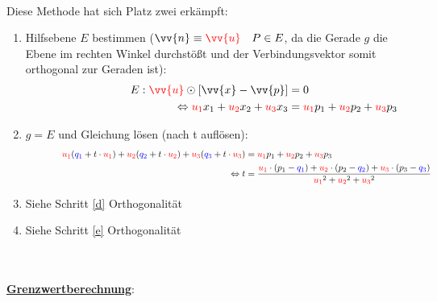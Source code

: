 \documentclass[main.tex]{subfiles}
\begin{document}
            \paragraph{} Diese Methode hat sich Platz zwei erkämpft:
                \begin{enumerate}[1)]
                    \item Hilfsebene $E$ bestimmen ($\vv{n}\equiv\textcolor{red}{\vv{u}}\quad P\in E$, da die Gerade $g$ die Ebene im rechten Winkel durchstößt und
                    der Verbindungsvektor somit orthogonal zur Geraden ist):
                    \begin{align*}
                        \qquad \qquad \qquad \qquad E:\textcolor{red}{\vv{u}} \odot [\vv{x} - \vv{p}] &= 0 \\
                                                    \Leftrightarrow \textcolor{red}{u_1}x_1 + \textcolor{red}{u_2}x_2 + \textcolor{red}{u_3}x_3 &= \textcolor{red}{u_1}p_1 + \textcolor{red}{u_2}p_2 + \textcolor{red}{u_3}p_3
                    \end{align*}
                    \item $g = E$ und Gleichung lösen (nach t auflösen):
                    \begin{align*}
                        \qquad \qquad \textcolor{red}{u_1}(\textcolor{blue}{q_1} + t \cdot \textcolor{red}{u_1}) + \textcolor{red}{u_2}(\textcolor{blue}{q_2}+t\cdot \textcolor{red}{u_2}) + \textcolor{red}{u_3}(\textcolor{blue}{q_3}+t\cdot \textcolor{red}{u_3}) &= \textcolor{red}{u_1}p_1 + \textcolor{red}{u_2}p_2 + \textcolor{red}{u_3}p_3 \\
                        \Leftrightarrow t &= \dfrac{\textcolor{red}{u_1} \cdot (p_1 - \textcolor{blue}{q_1}) + \textcolor{red}{u_2} \cdot (p_2 - \textcolor{blue}{q_2}) + \textcolor{red}{u_3} \cdot (p_3 - \textcolor{blue}{q_3})}{\textcolor{red}{u_1}^2 + \textcolor{red}{u_2}^2 + \textcolor{red}{u_3}^2}
                    \end{align*}
                    \item Siehe Schritt \ref{d} Orthogonalität
                    \item Siehe Schritt \ref{e} Orthogonalität
                \end{enumerate}

        \\
        \\
        \underline{\textbf{Grenzwertberechnung}}:
\end{document}
